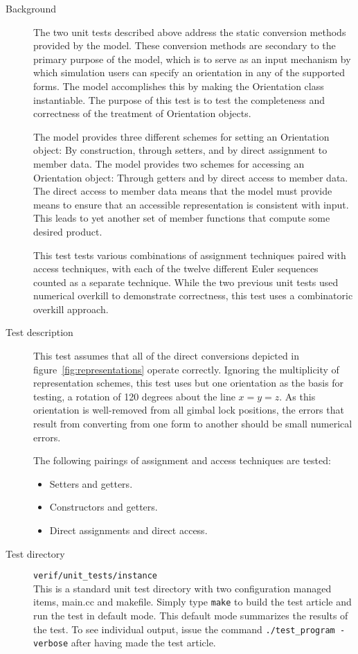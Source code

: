 \label{test:instance}
\begin{description}
\item[Background]
The two unit tests described above address the static conversion methods provided
by the model. These conversion methods are secondary to the primary purpose of
the model, which is to serve as an input mechanism by which simulation users can
specify an orientation in any of the supported forms. The model accomplishes
this by making the Orientation class instantiable.
The purpose of this test is to test the completeness and correctness of the
treatment of Orientation objects.

The model provides three different schemes for setting an Orientation object:
By construction, through setters, and by direct assignment to member data.
The model provides two schemes for accessing an Orientation object:
Through getters and by direct access to member data. The direct access to
member data means that the model must provide means to ensure that an
accessible representation is consistent with input. This leads to yet another
set of member functions that compute some desired product.

This test tests various combinations of assignment techniques paired with access
techniques, with each of the twelve different Euler sequences counted as
a separate technique. While the two previous unit tests used numerical overkill
to demonstrate correctness, this test uses a combinatoric overkill approach.

\item[Test description]
This test assumes that all of the direct conversions depicted in
figure~\ref{fig:representations} operate correctly. Ignoring the multiplicity
of representation schemes, this test uses but one orientation as the basis for
testing, a rotation of 120 degrees about the line $x=y=z$. As this orientation
is well-removed from all gimbal lock positions, the errors that result from
converting from one form to another should be small numerical errors.

The following pairings of assignment and access techniques are tested:
\begin{itemize}
\item Setters and getters.
\item Constructors and getters.
\item Direct assignments and direct access.
\end{itemize}

\item[Test directory] {\tt verif/unit\_tests/instance} \\
This is a standard unit test directory with two configuration managed items,
main.cc and makefile. Simply type {\tt make} to build the test article and run
the test in default mode. This default mode summarizes the results of the test.
To see individual output, issue the command {\tt ./test\_program -verbose} after
having made the test article.


\end{description}
